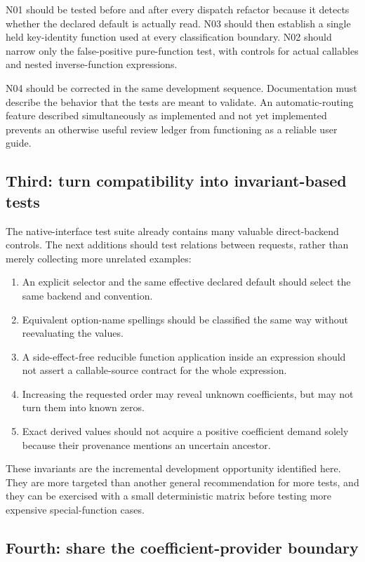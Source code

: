 \documentclass[11pt,letterpaper]{article}
\begin{document}
N01 should be tested before and after every dispatch refactor because it detects whether the declared default is actually read. N03 should then establish a single held key-identity function used at every classification boundary. N02 should narrow only the false-positive pure-function test, with controls for actual callables and nested inverse-function expressions.

N04 should be corrected in the same development sequence. Documentation must describe the behavior that the tests are meant to validate. An automatic-routing feature described simultaneously as implemented and not yet implemented prevents an otherwise useful review ledger from functioning as a reliable user guide.

\subsection{Third: turn compatibility into invariant-based tests}

The native-interface test suite already contains many valuable direct-backend controls. The next additions should test relations between requests, rather than merely collecting more unrelated examples:
\begin{enumerate}
\item An explicit selector and the same effective declared default should select the same backend and convention.
\item Equivalent option-name spellings should be classified the same way without reevaluating the values.
\item A side-effect-free reducible function application inside an expression should not assert a callable-source contract for the whole expression.
\item Increasing the requested order may reveal unknown coefficients, but may not turn them into known zeros.
\item Exact derived values should not acquire a positive coefficient demand solely because their provenance mentions an uncertain ancestor.
\end{enumerate}
These invariants are the incremental development opportunity identified here. They are more targeted than another general recommendation for more tests, and they can be exercised with a small deterministic matrix before testing more expensive special-function cases.

\subsection{Fourth: share the coefficient-provider boundary}
\end{document}
